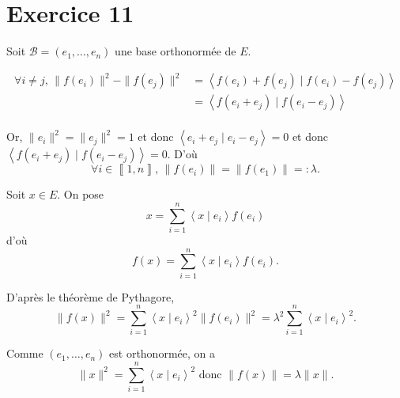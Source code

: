 \part{Exercice 11}

Soit $\mathcal{B} = (e_1, \ldots,e_n)$ une base orthonormée de $E$.

\begin{align*}
	\forall i \neq j,\,
	\|f(e_i)\|^2 - \|f(e_j)\|^2 &= \left<f(e_i) + f(e_j)  \mid f(e_i) - f(e_j) \right>\\
	&= \left<f(e_i + e_j)  \mid f(e_i - e_j) \right> \\
\end{align*}

Or, $\|e_i\|^2 = \|e_j\|^2 = 1$ et donc $\left<e_i+e_j \mid e_i-e_j \right> = 0$ et donc $\left<f(e_i + e_j)  \mid f(e_i-e_j) \right> = 0$.
D'où \[
	\forall i \in \left\llbracket 1,n \right\rrbracket,\,\|f(e_i)\| = \|f(e_1)\| =: \lambda
.\]

Soit $x \in E$. On pose \[
	x = \sum_{i=1}^n \left<x \mid e_i \right>f(e_i)
\] d'où \[
	f(x) = \sum_{i=1}^n \left<x \mid e_i \right>f(e_i)
.\]

D'après le théorème de Pythagore, \[
	\|f(x)\|^2 = \sum_{i=1}^n \left<x \mid e_i \right>^2 \|f(e_i)\|^2 = \lambda^2 \sum_{i=1}^n \left<x \mid e_i \right>^2
.\]

Comme $(e_1, \ldots, e_n)$ est orthonormée, on a \[
	\|x\|^2 = \sum_{i=1}^n \left<x \mid e_i \right>^2 \text{ donc } \|f(x)\| = \lambda \|x\|.
\]

